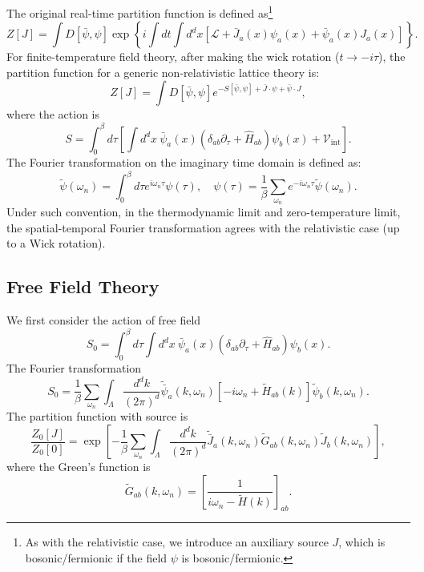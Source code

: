 The original real-time partition function is defined as\footnote{As with the relativistic case, we introduce an auxiliary source $J$, which is bosonic/fermionic if the field $\psi$ is bosonic/fermionic.
}
\begin{equation}
	Z[J] = \int D[\bar\psi,\psi] \exp\left\{i\int dt \int d^dx \left[\mathcal{L}+\bar{J}_a(x)\psi_a(x)+\bar{\psi}_a(x)J_a(x)\right]\right\}.
\end{equation}
For finite-temperature field theory, after making the wick rotation ($t \rightarrow -i\tau$), the partition function for a generic non-relativistic lattice theory is:
\begin{equation}
	Z[J] = \int D[\bar\psi,\psi] e^{-S[\bar\psi,\psi]+\bar{J}\cdot\psi+\bar{\psi}\cdot J},
\end{equation}
where the action is
\begin{equation}
	S = \int_0^\beta d\tau \left[\int d^dx\ \bar\psi_a(x) (\delta_{ab}\partial_\tau+\hat H_{ab})\psi_b(x) + \mathcal{V}_{\mathrm{int}}\right].
\end{equation}
The Fourier transformation on the imaginary time domain is defined as:
\begin{equation}
	\tilde\psi(\omega_n) = \int_0^\beta d\tau e^{i\omega_n\tau} \psi(\tau),\quad
	\psi(\tau) = \frac{1}{\beta}\sum_{\omega_n} e^{-i\omega_n\tau} \tilde\psi(\omega_n).
\end{equation}
Under such convention, in the thermodynamic limit and zero-temperature limit, the spatial-temporal Fourier transformation agrees with the relativistic case (up to a Wick rotation).



\subsection{Free Field Theory}
We first consider the action of free field
\begin{equation}
	S_0 = \int_0^\beta d\tau \int d^dx\ \bar\psi_a(x) (\delta_{ab}\partial_\tau+\hat H_{ab})\psi_b(x).
\end{equation}
The Fourier transformation
\begin{equation}
	S_0 = \frac{1}{\beta}\sum_{\omega_n} \int_{\Lambda} \frac{d^dk}{(2\pi)^d}
	\tilde{\bar{\psi}}_a(k,\omega_n)\left[-i\omega_n + \tilde{H}_{ab}(k)\right]\tilde{\psi}_b(k,\omega_n).
\end{equation}
The partition function with source is
\begin{equation}
	\frac{Z_0[J]}{Z_0[0]} = \exp\left[-\frac{1}{\beta}\sum_{\omega_n} \int_{\Lambda} \frac{d^dk}{(2\pi)^d}\tilde{\bar J}_a(k,\omega_n) \tilde{G}_{ab}(k,\omega_n) \tilde{J}_b(k,\omega_n) \right],
\end{equation}
where the Green's function is
\begin{equation}
	\tilde{G}_{ab}(k,\omega_n) = \left[\frac{1}{i\omega_n - \tilde{H}(k)}\right]_{ab}.
\end{equation}

